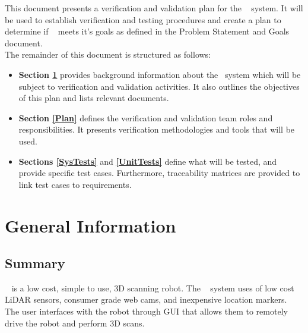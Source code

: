 \documentclass[12pt, titlepage]{article}
\begin{document}


\newpage

  
This document presents a verification and validation plan for the \progname~ system. It will be used to establish verification and testing procedures and create a plan to determine if \progname~ meets it's goals as defined in the Problem Statement and Goals document.\\
\newline
\noindent The remainder of this document is structured as follows:

\begin{itemize}
  \item \textbf{Section \ref{GeneralInfo}} provides background information about the ~\progname system which will be subject to verification and validation activities. It also outlines the objectives of this plan and lists relevant documents.
  \item \textbf{Section \ref{Plan}} defines the verification and validation team roles and responsibilities. It presents verification methodologies and tools that will be used.
  \item \textbf{Sections \ref{SysTests}} and \textbf{\ref{UnitTests}} define what will be tested, and provide specific test cases. Furthermore, traceability matrices are provided to link test cases to requirements.
\end{itemize}

\section{General Information} \label{GeneralInfo}

\subsection{Summary}

  
  \progname~ is a low cost, simple to use, 3D scanning robot. The \progname~ system uses of low cost LiDAR sensors, consumer grade web cams, and inexpensive location markers. The user interfaces with the robot through GUI that allows them to remotely drive the robot and perform 3D scans.
\end{document}
